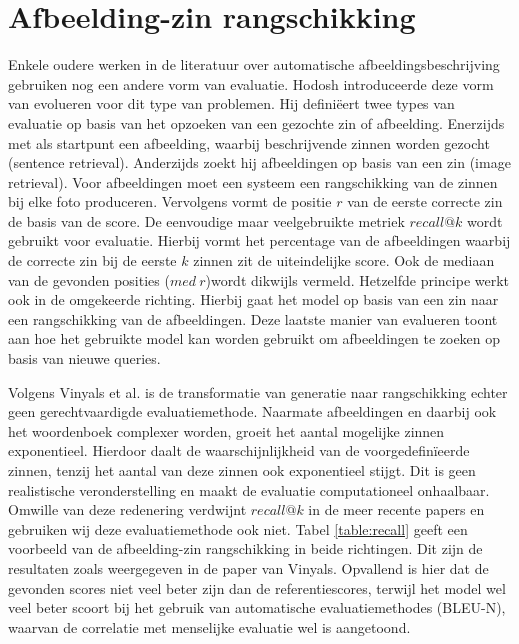 \section{Afbeelding-zin rangschikking}
Enkele oudere werken in de literatuur over automatische afbeeldingsbeschrijving gebruiken nog een andere vorm van evaluatie. Hodosh introduceerde deze vorm van evolueren voor dit type van problemen\cite{Hodosh2013}. Hij defini\"eert twee types van evaluatie op basis van het opzoeken van een gezochte zin of afbeelding. Enerzijds met als startpunt een afbeelding, waarbij beschrijvende zinnen worden gezocht (sentence retrieval). Anderzijds zoekt hij afbeeldingen op basis van een zin (image retrieval). Voor afbeeldingen moet een systeem een rangschikking van de zinnen bij elke foto produceren. Vervolgens vormt de positie $r$ van de eerste correcte zin de basis van de score. De eenvoudige maar veelgebruikte metriek $recall @ k$ wordt gebruikt voor evaluatie. Hierbij vormt het percentage van de afbeeldingen waarbij de correcte zin bij de eerste $k$ zinnen zit de uiteindelijke score. Ook de mediaan van de gevonden posities ($med\: r$)wordt dikwijls vermeld. Hetzelfde principe werkt ook in de omgekeerde richting. Hierbij gaat het model op basis van een zin naar een rangschikking van de afbeeldingen. Deze laatste manier van evalueren toont aan hoe het gebruikte model kan worden gebruikt om afbeeldingen te zoeken op basis van nieuwe queries. 

Volgens Vinyals et al.\cite{Google} is de transformatie van generatie naar rangschikking echter geen gerechtvaardigde evaluatiemethode. Naarmate afbeeldingen en daarbij ook het woordenboek complexer worden, groeit het aantal mogelijke zinnen exponentieel. Hierdoor daalt de waarschijnlijkheid van de voorgedefin\"ieerde zinnen, tenzij het aantal van deze zinnen ook exponentieel stijgt. Dit is geen realistische veronderstelling en maakt de evaluatie computationeel onhaalbaar. Omwille van deze redenering verdwijnt $recall @ k$ in de meer recente papers en gebruiken wij deze evaluatiemethode ook niet. Tabel \ref{table:recall} geeft een voorbeeld van de afbeelding-zin rangschikking in beide richtingen. Dit zijn de resultaten zoals weergegeven in de paper van Vinyals. Opvallend is hier dat de gevonden scores niet veel beter zijn dan de referentiescores, terwijl het model wel veel beter scoort bij het gebruik van automatische evaluatiemethodes (BLEU-N), waarvan de correlatie met menselijke evaluatie wel is aangetoond.


